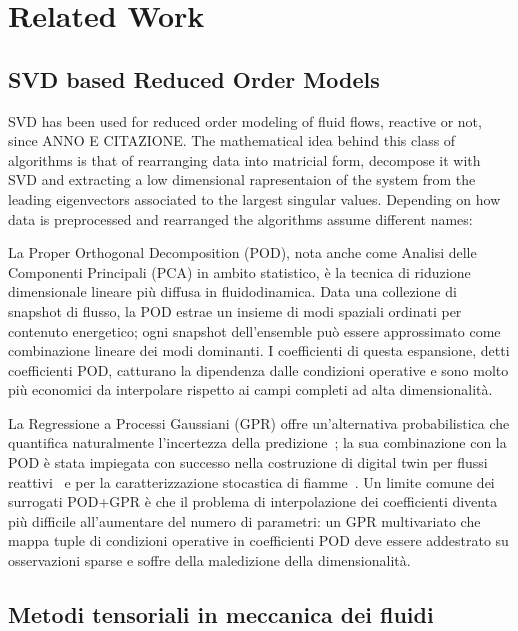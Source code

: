 \section{Related Work}

\subsection{SVD based Reduced Order Models}

SVD has been used for reduced order modeling of fluid flows, reactive or not, since ANNO E CITAZIONE. The mathematical idea behind this class of algorithms is that of rearranging data into matricial form, decompose it with SVD and extracting a low dimensional rapresentaion of the system from the leading eigenvectors associated to the largest singular values. Depending on how data is preprocessed and rearranged the algorithms assume different names: 



La Proper Orthogonal Decomposition (POD), nota anche come Analisi delle Componenti Principali (PCA) in ambito statistico, è la tecnica di riduzione dimensionale lineare più diffusa in fluidodinamica. Data una collezione di snapshot di flusso, la POD estrae un insieme di modi spaziali ordinati per contenuto energetico; ogni snapshot dell'ensemble può essere approssimato come combinazione lineare dei modi dominanti. I coefficienti di questa espansione, detti coefficienti POD, catturano la dipendenza dalle condizioni operative e sono molto più economici da interpolare rispetto ai campi completi ad alta dimensionalità.

La Regressione a Processi Gaussiani (GPR) offre un'alternativa probabilistica che quantifica naturalmente l'incertezza della predizione~\cite{williams1995gaussian}; la sua combinazione con la POD è stata impiegata con successo nella costruzione di digital twin per flussi reattivi~\cite{aversano2021digital} e per la caratterizzazione stocastica di fiamme~\cite{procacci2025stochastic}. Un limite comune dei surrogati POD+GPR è che il problema di interpolazione dei coefficienti diventa più difficile all'aumentare del numero di parametri: un GPR multivariato che mappa tuple di condizioni operative in coefficienti POD deve essere addestrato su osservazioni sparse e soffre della maledizione della dimensionalità.

\subsection{Metodi tensoriali in meccanica dei fluidi}

